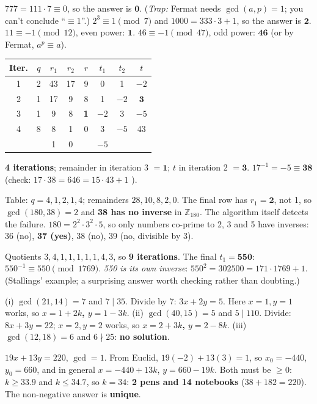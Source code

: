 \da $777 = 111\cdot7 \equiv 0$, so the answer is $\mathbf{0}$. (\emph{Trap:} Fermat needs $\gcd(a, p) = 1$; you can't conclude ``$\equiv 1$''.)
$2^3 \equiv 1 \pmod 7$ and $1000 = 333\cdot3 + 1$, so the answer is $\mathbf{2}$. \;$11 \equiv -1 \pmod{12}$, even power: $\mathbf{1}$. \;$46 \equiv -1 \pmod{47}$, odd power: $\mathbf{46}$ (or by Fermat, $a^p \equiv a$).

\da
\begin{center}\small
\begin{tabular}{@{}cccccccc@{}}
\toprule Iter. & $q$ & $r_1$ & $r_2$ & $r$ & $t_1$ & $t_2$ & $t$\\\midrule
1 & 2 & 43 & 17 & 9 & 0 & 1 & $-2$\\
2 & 1 & 17 & 9 & 8 & 1 & $-2$ & $\mathbf{3}$\\
3 & 1 & 9 & 8 & \textbf{1} & $-2$ & 3 & $-5$\\
4 & 8 & 8 & 1 & 0 & 3 & $-5$ & 43\\
 & & 1 & 0 & & $-5$ & & \\\bottomrule
\end{tabular}
\end{center}
\textbf{4 iterations}; remainder in iteration 3 $= \mathbf{1}$; $t$ in iteration 2 $= \mathbf{3}$. \;$17^{-1} = -5 \equiv \mathbf{38}$ (check: $17 \cdot 38 = 646 = 15\cdot43 + 1$ \checkmark).

\da Table: $q = 4, 1, 2, 1, 4$; remainders $28, 10, 8, 2, 0$. The final row has $r_1 = \mathbf{2}$, not 1, so $\gcd(180, 38) = 2$ and \textbf{38 has no inverse} in $\mathbb{Z}_{180}$. The algorithm itself detects the failure.
$180 = 2^2\cdot3^2\cdot5$, so only numbers co-prime to 2, 3 and 5 have inverses: 36 (no), \textbf{37 (yes)}, 38 (no), 39 (no, divisible by 3).

\da Quotients $3, 4, 1, 1, 1, 1, 1, 4, 3$, so \textbf{9 iterations}. The final $t_1 = \mathbf{550}$: $550^{-1} \equiv 550 \pmod{1769}$. \emph{550 is its own inverse}: $550^2 = 302500 = 171\cdot1769 + 1$. (Stallings' example; a surprising answer worth checking rather than doubting.)

\da (i) $\gcd(21, 14) = 7$ and $7 \mid 35$. Divide by 7: $3x + 2y = 5$. Here $x = 1, y = 1$ works, so \textbf{$x = 1 + 2k$, $y = 1 - 3k$}.
(ii) $\gcd(40, 15) = 5$ and $5 \mid 110$. Divide: $8x + 3y = 22$; $x = 2, y = 2$ works, so \textbf{$x = 2 + 3k$, $y = 2 - 8k$}.
(iii) $\gcd(12, 18) = 6$ and $6 \nmid 25$: \textbf{no solution}.

\da $19x + 13y = 220$, $\gcd = 1$. From Euclid, $19(-2) + 13(3) = 1$, so $x_0 = -440$, $y_0 = 660$, and in general $x = -440 + 13k$, $y = 660 - 19k$.
Both must be $\ge 0$: $k \ge 33.9$ and $k \le 34.7$, so $k = 34$: \textbf{2 pens and 14 notebooks} ($38 + 182 = 220$). The non-negative answer is \textbf{unique}.

